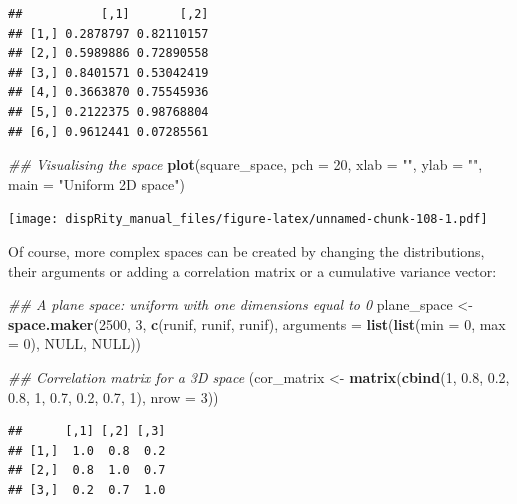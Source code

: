 \documentclass[]{book}
\newenvironment{Shaded}{\begin{snugshade}}{\end{snugshade}}
\newcommand{\CommentTok}[1]{\textcolor[rgb]{0.56,0.35,0.01}{\textit{#1}}}
\newcommand{\DataTypeTok}[1]{\textcolor[rgb]{0.13,0.29,0.53}{#1}}
\newcommand{\DecValTok}[1]{\textcolor[rgb]{0.00,0.00,0.81}{#1}}
\newcommand{\FloatTok}[1]{\textcolor[rgb]{0.00,0.00,0.81}{#1}}
\newcommand{\KeywordTok}[1]{\textcolor[rgb]{0.13,0.29,0.53}{\textbf{#1}}}
\newcommand{\NormalTok}[1]{#1}
\newcommand{\OtherTok}[1]{\textcolor[rgb]{0.56,0.35,0.01}{#1}}
\newcommand{\StringTok}[1]{\textcolor[rgb]{0.31,0.60,0.02}{#1}}
\begin{document}
\begin{verbatim}
##           [,1]       [,2]
## [1,] 0.2878797 0.82110157
## [2,] 0.5989886 0.72890558
## [3,] 0.8401571 0.53042419
## [4,] 0.3663870 0.75545936
## [5,] 0.2122375 0.98768804
## [6,] 0.9612441 0.07285561
\end{verbatim}

\begin{Shaded}
\begin{Highlighting}[]
\CommentTok{## Visualising the space}
\KeywordTok{plot}\NormalTok{(square_space, }\DataTypeTok{pch =} \DecValTok{20}\NormalTok{, }\DataTypeTok{xlab =} \StringTok{""}\NormalTok{, }\DataTypeTok{ylab =} \StringTok{""}\NormalTok{,}
     \DataTypeTok{main =} \StringTok{"Uniform 2D space"}\NormalTok{)}
\end{Highlighting}
\end{Shaded}

\texttt{[image: dispRity\_manual\_files/figure-latex/unnamed-chunk-108-1.pdf]}

Of course, more complex spaces can be created by changing the distributions, their arguments or adding a correlation matrix or a cumulative variance vector:

\begin{Shaded}
\begin{Highlighting}[]
\CommentTok{## A plane space: uniform with one dimensions equal to 0}
\NormalTok{plane_space <-}\StringTok{ }\KeywordTok{space.maker}\NormalTok{(}\DecValTok{2500}\NormalTok{, }\DecValTok{3}\NormalTok{, }\KeywordTok{c}\NormalTok{(runif, runif, runif),}
                           \DataTypeTok{arguments =} \KeywordTok{list}\NormalTok{(}\KeywordTok{list}\NormalTok{(}\DataTypeTok{min =} \DecValTok{0}\NormalTok{, }\DataTypeTok{max =} \DecValTok{0}\NormalTok{),}
                           \OtherTok{NULL}\NormalTok{, }\OtherTok{NULL}\NormalTok{))}

\CommentTok{## Correlation matrix for a 3D space}
\NormalTok{(cor_matrix <-}\StringTok{ }\KeywordTok{matrix}\NormalTok{(}\KeywordTok{cbind}\NormalTok{(}\DecValTok{1}\NormalTok{, }\FloatTok{0.8}\NormalTok{, }\FloatTok{0.2}\NormalTok{, }\FloatTok{0.8}\NormalTok{, }\DecValTok{1}\NormalTok{, }\FloatTok{0.7}\NormalTok{, }\FloatTok{0.2}\NormalTok{, }\FloatTok{0.7}\NormalTok{, }\DecValTok{1}\NormalTok{), }\DataTypeTok{nrow =} \DecValTok{3}\NormalTok{))}
\end{Highlighting}
\end{Shaded}

\begin{verbatim}
##      [,1] [,2] [,3]
## [1,]  1.0  0.8  0.2
## [2,]  0.8  1.0  0.7
## [3,]  0.2  0.7  1.0
\end{verbatim}
\end{document}
